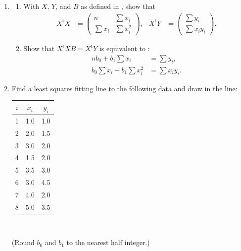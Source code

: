 \documentclass[a4paper, 12pt]{article}
\numberwithin{equation}{section}
\numberwithin{figure}{section}
\theoremstyle{definition}
\newcommand{\tr}{\mathrm{t}}
\begin{document}
\begin{enumerate}
	\item 
	\begin{enumerate} 
		\item With $X$, $Y$, and $B$ as defined in , show that 
		\begin{align*}
			X^\tr X &= \begin{pmatrix}
				n & \sum x_i \\ \sum x_i & \sum x_i^2
			\end{pmatrix}, & 
			X^\tr Y &= \begin{pmatrix}
				\sum y_i \\ \sum x_iy_i
			\end{pmatrix}. 
		\end{align*}
		\item Show that $X^\tr XB = X^\tr Y$ is equivalent to
		:
		\begin{align*}
			nb_0 + b_1\sum x_i &= \sum y_i, \\
			b_0 \sum x_i + b_1 \sum x_i^2 &= \sum x_iy_i.
		\end{align*}
	\end{enumerate}
	\item Find a least squares fitting line to the following data and draw in
	the line:
	
	\begin{minipage}{0.3\textwidth}
		\centering 
		\begin{tabular}{ccc}
			$i$ & $x_i$ & $y_i$ \\ \hline
			1 & 1.0 & 1.0 \\ 
			2 & 2.0 & 1.5 \\
			3 & 3.0 & 2.0 \\
			4 & 1.5 & 2.0 \\ 
			5 & 3.5 & 3.0 \\ 
			6 & 3.0 & 4.5 \\ 
			7 & 4.0 & 2.0 \\ 
			8 & 5.0 & 3.5
		\end{tabular}
	\end{minipage}~%
	\begin{minipage}{0.6\textwidth}
	\end{minipage}

	(Round $b_0$ and $b_1$ to the nearest half integer.)
\end{enumerate}
\end{document}
